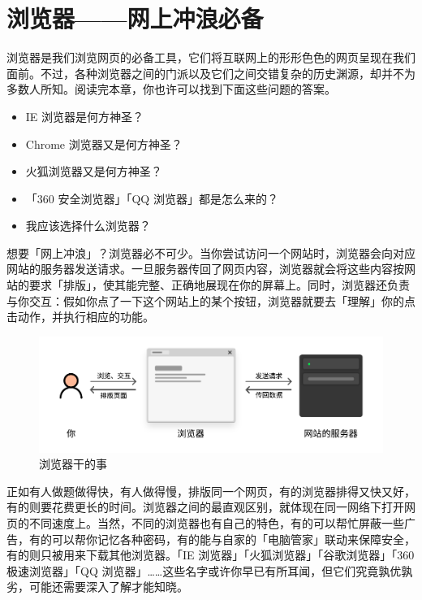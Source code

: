 \chapter{浏览器——网上冲浪必备}
\label{cha:browsers-and-how-to-choose}

\begin{intro}
  浏览器是我们浏览网页的必备工具，它们将互联网上的形形色色的网页呈现在我们面前。不过，各种浏览器之间的门派以及它们之间交错复杂的历史渊源，却并不为多数人所知。阅读完本章，你也许可以找到下面这些问题的答案。
  
  \begin{itemize}
    \item IE 浏览器是何方神圣？
    \item Chrome 浏览器又是何方神圣？
    \item 火狐浏览器又是何方神圣？
    \item 「360 安全浏览器」「QQ 浏览器」都是怎么来的？
    \item 我应该选择什么浏览器？
  \end{itemize}
\end{intro}

想要「网上冲浪」？浏览器必不可少。当你尝试访问一个网站时，浏览器会向对应网站的服务器发送请求。一旦服务器传回了网页内容，浏览器就会将这些内容按网站的要求「排版」，使其能完整、正确地展现在你的屏幕上。同时，浏览器还负责与你交互：假如你点了一下这个网站上的某个按钮，浏览器就要去「理解」你的点击动作，并执行相应的功能。

\begin{figure}[htb!]
  \centering
  \includegraphics[width=.95\textwidth]{assets/software/How_browser_works.pdf}
  \caption{浏览器干的事}
  \label{fig:How_browser_works}
\end{figure}

正如有人做题做得快，有人做得慢，排版同一个网页，有的浏览器排得又快又好，有的则要花费更长的时间。浏览器之间的最直观区别，就体现在同一网络下打开网页的不同速度上。当然，不同的浏览器也有自己的特色，有的可以帮忙屏蔽一些广告，有的可以帮你记忆各种密码，有的能与自家的「电脑管家」联动来保障安全，有的则只被用来下载其他浏览器。「IE 浏览器」「火狐浏览器」「谷歌浏览器」「360 极速浏览器」「QQ 浏览器」……这些名字或许你早已有所耳闻，但它们究竟孰优孰劣，可能还需要深入了解才能知晓。


